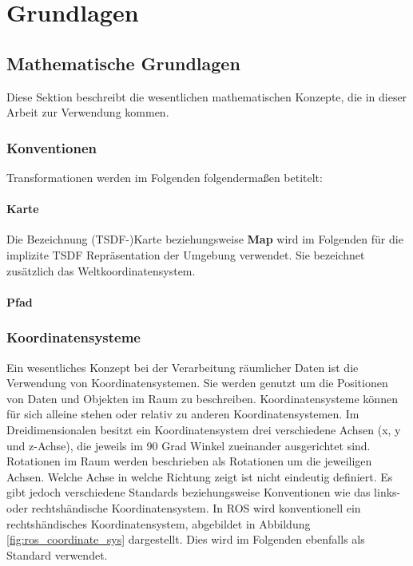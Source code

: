 \chapter{Grundlagen}


\section{Mathematische Grundlagen}

Diese Sektion beschreibt die wesentlichen mathematischen Konzepte, die in dieser Arbeit zur Verwendung kommen.

\subsection{Konventionen}

Transformationen werden im Folgenden folgendermaßen betitelt: 

\subsubsection{Karte}

Die Bezeichnung (TSDF-)Karte beziehungsweise \textbf{Map} wird im Folgenden für die implizite TSDF Repräsentation der Umgebung verwendet.
Sie bezeichnet zusätzlich das Weltkoordinatensystem.

\subsubsection{Pfad}


\subsection{Koordinatensysteme}

Ein wesentliches Konzept bei der Verarbeitung räumlicher Daten ist die Verwendung von Koordinatensystemen.
Sie werden genutzt um die Positionen von Daten und Objekten im Raum zu beschreiben.
Koordinatensysteme können für sich alleine stehen oder relativ zu anderen Koordinatensystemen.
Im Dreidimensionalen besitzt ein Koordinatensystem drei verschiedene Achsen (x, y und z-Achse), die jeweils im 90 Grad Winkel zueinander ausgerichtet sind.
Rotationen im Raum werden beschrieben als Rotationen um die jeweiligen Achsen.
Welche Achse in welche Richtung zeigt ist nicht eindeutig definiert.
Es gibt jedoch verschiedene Standards beziehungsweise Konventionen wie das links- oder rechtshändische Koordinatensystem.
In ROS wird konventionell ein rechtshändisches Koordinatensystem, abgebildet in Abbildung \ref{fig:ros_coordinate_sys} dargestellt. Dies wird im Folgenden ebenfalls als Standard verwendet.

